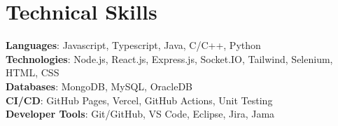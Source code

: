 \documentclass[letterpaper,11pt]{article}
\begin{document}
\section{Technical Skills}
  \begin{itemize}[leftmargin=0.15in, label={}]
    \small{\item{
      \textbf{Languages}{: Javascript, Typescript, Java, C/C++, Python} \\
      \textbf{Technologies}{: Node.js, React.js, Express.js, Socket.IO, Tailwind, Selenium, HTML, CSS} \\
      \textbf{Databases}{: MongoDB, MySQL, OracleDB} \\
      \textbf{CI/CD}{: GitHub Pages, Vercel, GitHub Actions, Unit Testing} \\
      \textbf{Developer Tools}{: Git/GitHub, VS Code, Eclipse, Jira, Jama} \\
    }}
  \end{itemize}
\end{document}
